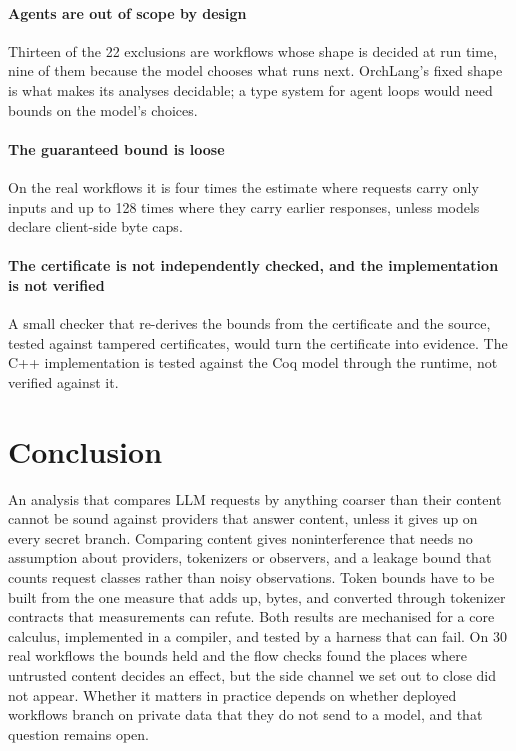 \paragraph{Agents are out of scope by design} Thirteen of the 22 exclusions are workflows
whose shape is decided at run time, nine of them because the model chooses what runs
next. OrchLang's fixed shape is what makes its analyses decidable; a type system for
agent loops would need bounds on the model's choices.

\paragraph{The guaranteed bound is loose} On the real workflows it is four times the
estimate where requests carry only inputs and up to 128 times where they carry earlier
responses, unless models declare client-side byte caps.

\paragraph{The certificate is not independently checked, and the implementation is not
verified} A small checker that re-derives the bounds from the certificate and the source,
tested against tampered certificates, would turn the certificate into evidence. The C++
implementation is tested against the Coq model through the runtime, not verified against
it.

\section{Conclusion}\label{sec:conclusion-final}

An analysis that compares LLM requests by anything coarser than their content cannot be
sound against providers that answer content, unless it gives up on every secret branch.
Comparing content gives noninterference that needs no assumption about providers,
tokenizers or observers, and a leakage bound that counts request classes rather than
noisy observations. Token bounds have to be built from the one measure that adds up,
bytes, and converted through tokenizer contracts that measurements can refute. Both
results are mechanised for a core calculus, implemented in a compiler, and tested by a
harness that can fail. On 30 real workflows the bounds held and the flow checks found
the places where untrusted content decides an effect, but the side channel we set out
to close did not appear. Whether it matters in practice depends on whether deployed
workflows branch on private data that they do not send to a model, and that question
remains open.
